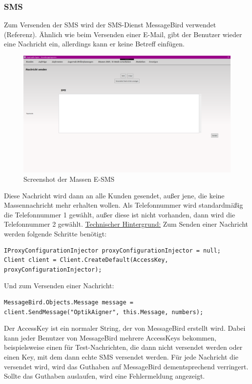 \subsubsection{SMS}
Zum Versenden der SMS wird der SMS-Dienst MessageBird verwendet (Referenz). Ähnlich wie beim Versenden einer E-Mail, gibt der Benutzer wieder eine Nachricht ein, allerdings kann er keine Betreff einfügen.
\begin{figure}[H]
\begin{center}
	\includegraphics[scale=.25]{images/Massensms.png}
\end{center}
	\caption{Screenshot der Massen E-SMS}
	\label{fig:sample}
\end{figure}
Diese Nachricht wird dann an alle Kunden gesendet, außer jene, die keine Massennachricht mehr erhalten wollen. Als Telefonnummer wird standardmäßig die Telefonnummer 1 gewählt, außer diese ist nicht vorhanden, dann wird die Telefonnummer 2 gewählt. 
\newpage
\underline{Technischer Hintergrund:}
\linebreak
\linebreak 
Zum Senden einer Nachricht werden folgende Schritte benötigt:
\begin{lstlisting}
IProxyConfigurationInjector proxyConfigurationInjector = null;
Client client = Client.CreateDefault(AccessKey, proxyConfigurationInjector);
\end{lstlisting}
Und zum Versenden einer Nachricht:
\begin{lstlisting}
MessageBird.Objects.Message message = client.SendMessage("OptikAigner", this.Message, numbers);
\end{lstlisting}
Der AccessKey ist ein normaler String, der von MessageBird erstellt wird. Dabei kann jeder Benutzer von MessageBird mehrere AccessKeys bekommen, beispielsweise einen für Test-Nachrichten, die dann nicht versendet werden oder einen Key, mit dem dann echte SMS versendet werden.
Für jede Nachricht die versendet wird, wird das Guthaben auf MessageBird dementsprechend verringert. Sollte das Guthaben auslaufen, wird eine Fehlermeldung angezeigt.


